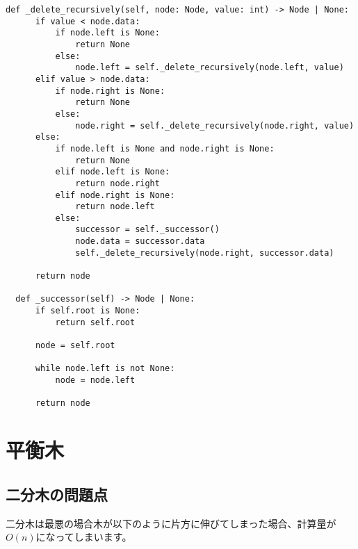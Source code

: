 \begin{lstlisting}[caption=二分木の実装, frame=TRBL, label={binary_tree}]
  def _delete_recursively(self, node: Node, value: int) -> Node | None:
      if value < node.data:
          if node.left is None:
              return None
          else:
              node.left = self._delete_recursively(node.left, value)
      elif value > node.data:
          if node.right is None:
              return None
          else:
              node.right = self._delete_recursively(node.right, value)
      else:
          if node.left is None and node.right is None:
              return None
          elif node.left is None:
              return node.right
          elif node.right is None:
              return node.left
          else:
              successor = self._successor()
              node.data = successor.data
              self._delete_recursively(node.right, successor.data)
              
      return node
  
  def _successor(self) -> Node | None:
      if self.root is None:
          return self.root
      
      node = self.root
      
      while node.left is not None:
          node = node.left
      
      return node
\end{lstlisting}

\newpage

\section{平衡木}
\subsection{二分木の問題点}
二分木は最悪の場合木が以下のように片方に伸びてしまった場合、計算量が$O(n)$になってしまいます。

\vspace{0.5cm}

\begin{center}
\end{center}

